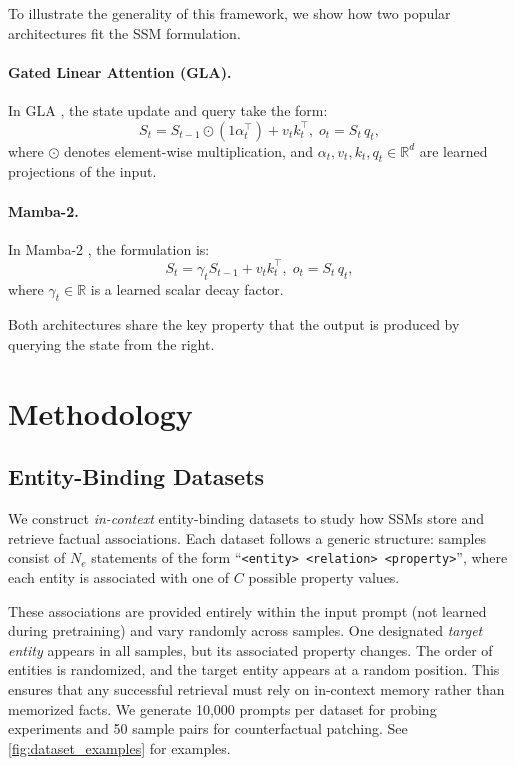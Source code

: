 \documentclass[11pt]{article}
\begin{document}
To illustrate the generality of this framework, we show how two popular architectures fit the SSM formulation.

\paragraph{Gated Linear Attention (GLA).}
In GLA \cite{yang2023gla}, the state update and query take the form:
\begin{equation}
    S_t = S_{t-1} \odot (1 \alpha_t^\top) + v_t k_t^\top, \; o_t = S_t \, q_t,
    \label{eq:gla}
\end{equation}
where $\odot$ denotes element-wise multiplication, and $\alpha_t, v_t, k_t, q_t \in \mathbb{R}^{d}$ are learned projections of the input.

\paragraph{Mamba-2.}
In Mamba-2 \cite{dao2024ssmduality}, the formulation is:
\begin{equation}
    S_t = \gamma_t S_{t-1} + v_t k_t^\top, \; o_t = S_t \, q_t,
    \label{eq:mamba}
\end{equation}
where $\gamma_t \in \mathbb{R}$ is a learned scalar decay factor.

Both architectures share the key property that the output is produced by querying the state from the right.

\section{Methodology}
\label{sec:methodology}

\subsection{Entity-Binding Datasets}
\label{sec:datasets}

We construct \emph{in-context} entity-binding datasets \cite{feng2024binding} to study how SSMs store and retrieve factual associations. Each dataset follows a generic structure: samples consist of $N_e$ statements of the form ``\texttt{<entity> <relation> <property>}'', where each entity is associated with one of $C$ possible property values.

These associations are provided entirely within the input prompt (not learned during pretraining) and vary randomly across samples. One designated \emph{target entity} appears in all samples, but its associated property changes. The order of entities is randomized, and the target entity appears at a random position. This ensures that any successful retrieval must rely on in-context memory rather than memorized facts. We generate 10{,}000 prompts per dataset for probing experiments and 50 sample pairs for counterfactual patching. See \cref{fig:dataset_examples} for examples.
\end{document}
